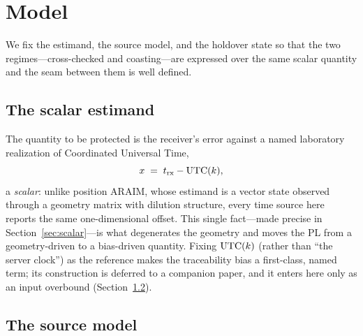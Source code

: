 \section{Model}
\label{sec:model}

We fix the estimand, the source model, and the holdover state so that the two
regimes---cross-checked and coasting---are expressed over the same scalar
quantity and the seam between them is well defined.

\subsection{The scalar estimand}
\label{sec:estimand}

The quantity to be protected is the receiver's error against a named laboratory
realization of Coordinated Universal Time,
\begin{equation}
  x \;=\; t_{\mathrm{rx}} - \mathrm{UTC}(k){},
  \label{eq:estimand}
\end{equation}
a \emph{scalar}: unlike position ARAIM, whose estimand is a vector state observed
through a geometry matrix with dilution structure, every time source here reports
the same one-dimensional offset. This single fact---made precise in
Section~\ref{sec:scalar}---is what degenerates the geometry and moves the PL from
a geometry-driven to a bias-driven quantity. Fixing $\mathrm{UTC}(k){}$ (rather than
``the server clock'') as the reference makes the traceability bias a first-class,
named term; its construction is deferred to a companion paper, and it enters here
only as an input overbound (Section~\ref{sec:sourcemodel}).

\subsection{The source model}
\label{sec:sourcemodel}

